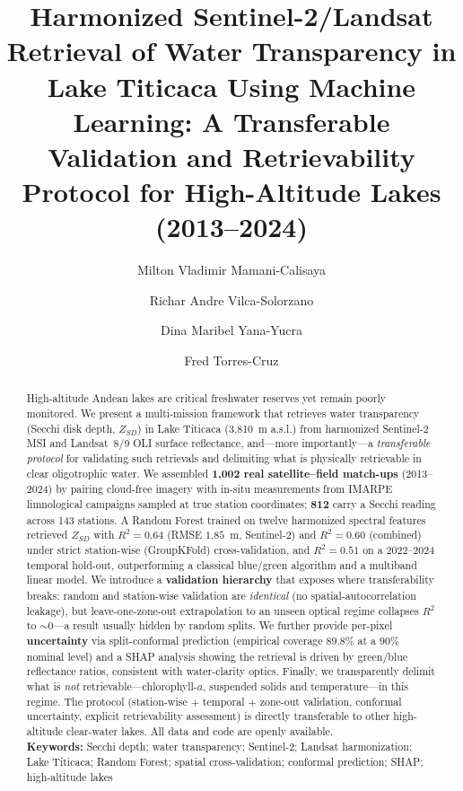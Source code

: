 \documentclass[11pt]{article}
\title{\textbf{Harmonized Sentinel-2/Landsat Retrieval of Water Transparency
in Lake Titicaca Using Machine Learning: A Transferable Validation and
Retrievability Protocol for High-Altitude Lakes (2013--2024)}}
\author[1]{Milton Vladimir Mamani-Calisaya}
\author[1,*]{Richar Andre Vilca-Solorzano}
\author[1]{Dina Maribel Yana-Yucra}
\author[1]{Fred Torres-Cruz}
\affil[1]{Faculty of Statistical and Computer Engineering, Universidad Nacional
del Altiplano (UNAP), Puno, Peru}
\affil[*]{Corresponding author: \texttt{75521963@est.unap.edu.pe}}
\date{}
\begin{document}
\maketitle

\begin{abstract}
\noindent
High-altitude Andean lakes are critical freshwater reserves yet remain poorly
monitored. We present a multi-mission framework that retrieves water transparency
(Secchi disk depth, $Z_{SD}$) in Lake Titicaca (3{,}810~m a.s.l.) from harmonized
Sentinel-2 MSI and Landsat~8/9 OLI surface reflectance, and---more importantly---a
\emph{transferable protocol} for validating such retrievals and delimiting what is
physically retrievable in clear oligotrophic water. We assembled
\textbf{1{,}002 real satellite--field match-ups} (2013--2024) by pairing
cloud-free imagery with in-situ measurements from IMARPE limnological campaigns
sampled at true station coordinates; \textbf{812} carry a Secchi reading across
143 stations. A Random Forest trained on twelve harmonized spectral features
retrieved $Z_{SD}$ with $R^2=0.64$ (RMSE $1.85$~m, Sentinel-2) and $R^2=0.60$
(combined) under strict station-wise (GroupKFold) cross-validation, and
$R^2=0.51$ on a 2022--2024 temporal hold-out, outperforming a classical
blue/green algorithm and a multiband linear model. We introduce a
\textbf{validation hierarchy} that exposes where transferability breaks: random
and station-wise validation are \emph{identical} (no spatial-autocorrelation
leakage), but leave-one-zone-out extrapolation to an unseen optical regime
collapses $R^2$ to $\sim0$---a result usually hidden by random splits. We further
provide per-pixel \textbf{uncertainty} via split-conformal prediction
(empirical coverage $89.8\%$ at a $90\%$ nominal level) and a SHAP analysis showing
the retrieval is driven by green/blue reflectance ratios, consistent with
water-clarity optics. Finally, we transparently delimit what is \emph{not}
retrievable---chlorophyll-$a$, suspended solids and temperature---in this regime.
The protocol (station-wise $+$ temporal $+$ zone-out validation, conformal
uncertainty, explicit retrievability assessment) is directly transferable to other
high-altitude clear-water lakes. All data and code are openly available.
\\[0.4em]
\textbf{Keywords:} Secchi depth; water transparency; Sentinel-2; Landsat
harmonization; Lake Titicaca; Random Forest; spatial cross-validation; conformal
prediction; SHAP; high-altitude lakes
\end{abstract}
\end{document}
